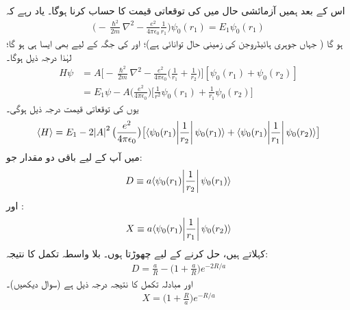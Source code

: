  اس کے بعد ہمیں آزمائشی حال  میں  کی توقعاتی قیمت کا حساب کرنا ہوگا۔ یاد رہے کہ 
 \begin{align*}
\big(-\frac{\hslash^{2}}{2m}\nabla^{2}-\frac{e^{2}}{4\pi\epsilon_{0}}\frac{1}{r_{1}}\big)\psi_{0}(r_{1})=E_{1}\psi_{0}(r_{1})
\end{align*}
ہو گا ( جہاں  جوہری ہائیڈروجن کی زمینی حال توانائی ہے)؛ اور  کی جگہ  کے لیے بھی ایسا ہی ہو گا؛ لہٰذا درجہ ذیل ہوگا۔
\begin{align*}
 H\psi&=A\big[-\frac{\hslash^{2}}{2m}\nabla^{2}-\frac{e^{2}}{4\pi\epsilon_{0}}\big(\frac{1}{r_{1}}+\frac{1}{r_{2}}\big)\big][\psi_{0}(r_{1})+\psi_{0}(r_{2})]\\
&=E_{1}\psi-A\big(\frac{e^{2}}{4\pi\epsilon_{0}}\big)\big[\frac{1}{r^{2}}\psi_{0}(r_{1})+\frac{1}{r_{1}}\psi_{0}(r_{2})\big]
\end{align*}
 یوں کی توقعاتی قیمت درجہ ذیل ہوگی۔
\begin{align}
\langle H \rangle =E_{1}-2\abs{A}^{2}\big(\frac{e^{2}}{4\pi\epsilon_{0}}\big)\big[\langle \psi_{0}(r_{1})\abs{\frac{1}{r_{2}}}\psi_{0}(r_{1})\rangle +\langle \psi_{0}(r_{1})\abs{\frac{1}{r_{1}}}\psi_{0}(r_{2})\rangle\big]
\end{align}
 میں آپ کے لیے باقی دو مقدار جو: 
\begin{align}\label{مساوات_تغیریت_بلاواسطہ_تکمل}
D\equiv a\langle \psi_{0}(r_{1})\abs{\frac{1}{r_{2}}}\psi_{0}(r_{1})\rangle
\end{align}
 اور : 
\begin{align}\label{مساوات_تغیریت_مبادلہ_تکمل}
X\equiv a\langle\psi_{0}(r_{1})\abs{\frac{1}{r_{1}}}\psi_{0}(r_{2})\rangle
\end{align}
 کہلاتے ہیں، حل کرنے کے لیے چھوڑتا ہوں۔ بلا واسطہ تکمل کا نتیجہ:
\begin{align}\label{مساوات_تغیریت_نتیجہ_بلاواسطہ_تکمل}
D=\frac{a}{R}-\big(1+\frac{a}{R}\big)e^{-2R/a} 
\end{align}
 اور مبادلہ تکمل کا نتیجہ درجہ ذیل ہے (سوال  دیکھیں)۔ 
\begin{align}\label{مساوات_تغیریت_نتیجہ_مبادلہ_تکمل}
X=\big(1+\frac{R}{a}\big)e^{-R/a} 
\end{align}

